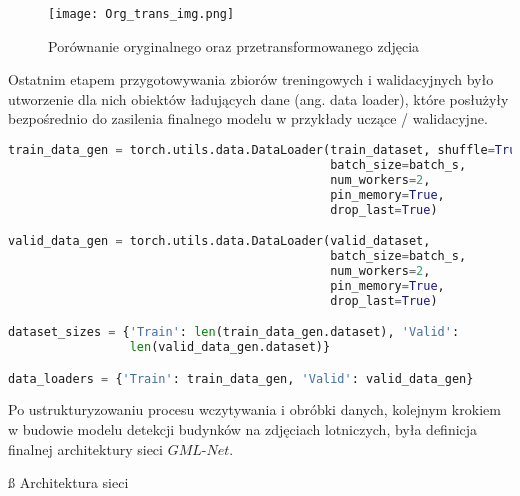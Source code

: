 \begin{figure}[!h]
    \centering \texttt{[image: Org\_trans\_img.png]}
    \captionsetup{format=hang}
    \caption{Porównanie oryginalnego oraz przetransformowanego zdjęcia}
    \label{fig:org_trans1}
\end{figure}

\cell
Ostatnim etapem przygotowywania zbiorów treningowych i walidacyjnych było utworzenie dla nich obiektów ładujących dane (ang. data loader), które posłużyły bezpośrednio do zasilenia finalnego modelu w przykłady uczące / walidacyjne.

\cell
\begin{lstlisting}[name=Rozdzial3.1, language=Python]
train_data_gen = torch.utils.data.DataLoader(train_dataset, shuffle=True, 
                                             batch_size=batch_s, 
                                             num_workers=2, 
                                             pin_memory=True, 
                                             drop_last=True)

valid_data_gen = torch.utils.data.DataLoader(valid_dataset, 
                                             batch_size=batch_s, 
                                             num_workers=2, 
                                             pin_memory=True, 
                                             drop_last=True)

dataset_sizes = {'Train': len(train_data_gen.dataset), 'Valid': 
                 len(valid_data_gen.dataset)}

data_loaders = {'Train': train_data_gen, 'Valid': valid_data_gen}
\end{lstlisting}


\cell
Po ustrukturyzowaniu procesu wczytywania i obróbki danych, kolejnym krokiem  w budowie modelu detekcji budynków na zdjęciach lotniczych, była definicja finalnej architektury sieci $\textit{GML-Net}$.

\vspace{-0.5cm}
\cell
\ss{ Architektura sieci}

